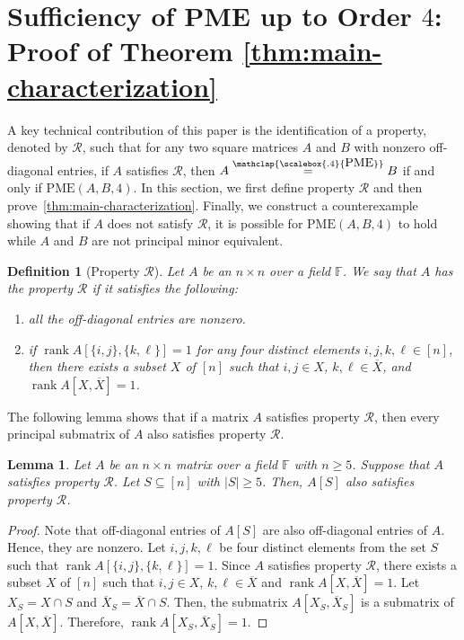 \documentclass[11pt,letterpaper]{article}
\DeclareMathOperator*{\rank}{rank}
\newcommand{\comp}[1]{\overline{#1}}
\newcommand{\F}{\mathbb{F}}
\newtheorem{lemma}{Lemma}[section]
\newtheorem{definition}{Definition}[section]
\newcommand{\PME}{\stackrel{\mathclap{\scalebox{.4}{\mbox{PME}}}}{=}}
\newcommand{\kPME}[3]{\mathrm{PME}(#1, #2, #3)}
\newcommand{\prop}{\mathcal{R}}
\begin{document}
{{{\section{Sufficiency of PME up to Order $4$: Proof of Theorem \ref{thm:main-characterization}}
\label{sec:PME-upto-4-characterization}

A key technical contribution of this paper is the identification of a property, denoted by $\prop$, such that for any two square matrices $A$ and $B$ with nonzero off-diagonal entries, if $A$ satisfies $\prop$, then $A \PME B$ if and only if $\kPME{A}{B}{4}$. In this section, we first define property $\prop$ and then prove~\cref{thm:main-characterization}. Finally, we construct a counterexample showing that if $A$ does not satisfy $\prop$, it is possible for $\kPME{A}{B}{4}$ to hold while $A$ and $B$ are not principal minor equivalent.

\begin{definition}[Property $\prop$]
\label{def:matrix-property}
Let $A$ be an $n\times n$ over a field $\F$. We say that $A$ has the \emph{property $\prop$} if it satisfies the following:
\begin{enumerate}
\item all the off-diagonal entries are nonzero.
\item if $\rank A[\{i,j\}, \{k,\ell\}]=1$ for any  four distinct elements $i, j,k,\ell\in[n]$, then there exists a subset $X$ of $[n]$ such that $i,j\in X$, $k,\ell\in\comp{X}$, and $\rank A[X, \comp{X}]=1$.
\end{enumerate}
\end{definition}

The following lemma shows that if a matrix $A$ satisfies property $\prop$, then every principal submatrix of $A$ also satisfies property $\prop$.

\begin{lemma}
\label{prop:matrix-property-large-to-small}
Let $A$ be an $n\times n$ matrix over a field $\F$ with $n\geq 5$. Suppose that $A$ satisfies property $\prop$. Let  $S\subseteq [n]$ with $|S|\geq 5$. Then, $A[S]$ also satisfies property $\prop$.
\end{lemma}
\begin{proof}
Note that off-diagonal entries of $A[S]$ are also off-diagonal entries of $A$. Hence, they are nonzero. Let $i,j,k, \ell$ be four distinct elements from the set $S$ such that $\rank A[\{i,j\}, \{k,\ell\}]=1$. Since $A$ satisfies property $\prop$, there exists a subset $X$ of $[n]$ such that $i, j\in X$, $k,\ell\in\comp{X}$ and $\rank A[X, \comp{X}]=1$. Let $X_S=X\cap S$ and $\comp{X}_S=\comp{X}\cap S$. Then, the submatrix $A[X_S, \comp{X}_S]$ is a submatrix of $A[X, \comp{X}]$. Therefore, $\rank A[X_S, \comp{X}_S]=1$.
\end{proof}

}}}
\end{document}

